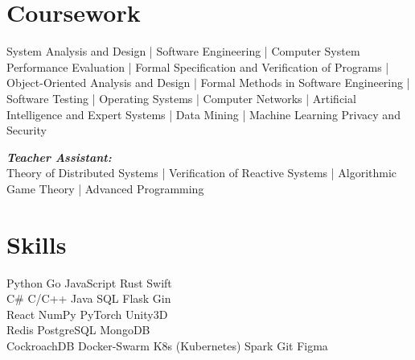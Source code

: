 \documentclass[letterpaper]{deedy-resume} %
\begin{document}
\begin{minipage}[t]{0.33\textwidth}
\sectionspace %


%
%


\section{Coursework}
System Analysis and Design |
Software Engineering |
Computer System Performance Evaluation |
Formal Specification and Verification of Programs |
Object-Oriented Analysis and Design |
Formal Methods in Software Engineering |
Software Testing |
Operating Systems |
Computer Networks |
Artificial Intelligence and Expert Systems |
Data Mining | Machine Learning Privacy and Security

{\footnotesize \textit{\textbf{Teacher Assistant: }}} \\

Theory of Distributed Systems |
Verification of Reactive Systems |
Algorithmic Game Theory |
Advanced Programming

\sectionspace %


\section{Skills}
Python \textbullet{} Go \textbullet{} JavaScript \textbullet{} Rust \textbullet{} Swift \\ %
C\# \textbullet{} C/C++ \textbullet{} Java \textbullet{} SQL \textbullet{} Flask \textbullet{} Gin \\ %
React \textbullet{} NumPy \textbullet{} PyTorch \textbullet{} Unity3D \\ %
Redis \textbullet{} PostgreSQL \textbullet{} MongoDB \\ %
CockroachDB \textbullet{} Docker-Swarm \textbullet{} K8s (Kubernetes) \textbullet{} Spark \textbullet{} Git \textbullet{} Figma
\sectionspace %


\end{minipage} %
\end{document}

